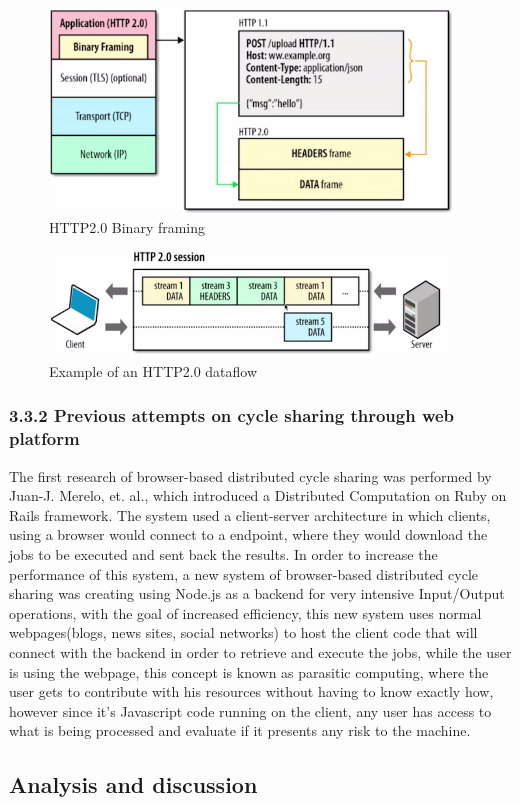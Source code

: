 \begin{figure}[htbp]
  \centering
  \includegraphics[width=0.95\textwidth]{img/http2binaryframing.png}
  \caption{HTTP2.0 Binary framing}
  \label{fig:binaryframing}
\end{figure}

\begin{figure}[htbp]
  \centering
  \includegraphics[width=0.95\textwidth]{img/http2dataflow.png}
  \caption{Example of an HTTP2.0 dataflow}
  \label{fig:http2dataflow}
\end{figure}


\subsubsection{3.3.2 Previous attempts on cycle sharing through web platform}
The first research of browser-based distributed cycle sharing was performed by Juan-J. Merelo, et. al., which introduced a Distributed Computation on Ruby on Rails framework\cite{Merelo2007}. The system used a client-server architecture in which clients, using a browser would connect to a endpoint, where they would download the jobs to be executed and sent back the results. In order to increase the performance of this system, a new system\cite{Duda2013} of browser-based distributed cycle sharing was creating using Node.js as a backend for very intensive Input/Output operations\cite{Tilkov2010}, with the goal of increased efficiency, this new system uses normal webpages(blogs, news sites, social networks) to host the client code that will connect with the backend in order to retrieve and execute the jobs, while the user is using the webpage, this concept is known as parasitic computing\cite{Barabasi2001}, where the user gets to contribute with his resources without having to know exactly how, however since it's Javascript code running on the client, any user has access to what is being processed and evaluate if it presents any risk to the machine.


\subsection{Analysis and discussion}

